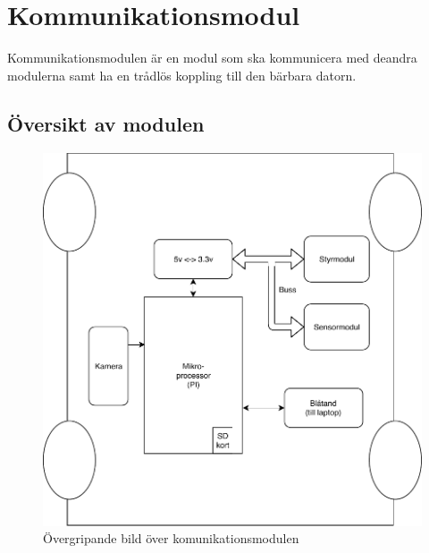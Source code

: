 \documentclass[systemskiss/skiss.tex]{subfiles}
\begin{document}
\section{Kommunikationsmodul}
Kommunikationsmodulen är en modul som ska kommunicera med deandra modulerna samt ha en trådlös koppling till den bärbara datorn. 
\subsection{Översikt av modulen}
\begin{figure}[h]
    \centering
    \includegraphics[width=0.6\linewidth]{systemskiss/figures/kommodul.pdf}
    \caption{Övergripande bild över komunikationsmodulen}
    \label{fig:komskiss}
\end{figure}
\end{document}
